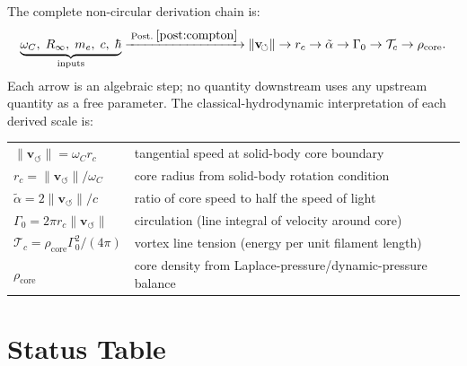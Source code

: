 \documentclass[aps,pra,preprint,longbibliography,nofootinbib]{revtex4-2}
\newcommand{\vnorm}{\lVert\mathbf{v}_{\!\boldsymbol{\circlearrowleft}}\rVert} %
\newcommand{\rhocore}{\rho_{\mathrm{core}}}      %
\newcommand{\rc}{r_c}                            %
\newcommand{\omC}{\omega_C}                      %
\newcommand{\Rinf}{R_\infty}                     %
\newcommand{\Tc}{\mathcal{T}_c}                  %
\newcommand{\Gz}{\Gamma_0}                       %
\begin{document}
The complete non-circular derivation chain is:
\begin{equation}
  \underbrace{\omC,\;\Rinf,\;m_e,\;c,\;\hbar}_{\text{inputs}}
  \xrightarrow{\;\text{Post.}\;\ref{post:compton}\;}
  \vnorm
  \rightarrow
  \rc
  \rightarrow
  \tilde\alpha
  \rightarrow
  \Gz
  \rightarrow
  \Tc
  \rightarrow
  \rhocore.
  \label{eq:chain}
\end{equation}
Each arrow is an algebraic step; no quantity downstream uses
any upstream quantity as a free parameter.
The classical-hydrodynamic interpretation of each derived scale is:

\medskip
\begin{tabular}{ll}
$\vnorm = \omC\rc$
  & tangential speed at solid-body core boundary \\
$\rc = \vnorm/\omC$
  & core radius from solid-body rotation condition \\
$\tilde\alpha = 2\vnorm/c$
  & ratio of core speed to half the speed of light \\
$\Gz = 2\pi\rc\vnorm$
  & circulation (line integral of velocity around core) \\
$\Tc = \rhocore\Gz^2/(4\pi)$
  & vortex line tension (energy per unit filament length) \\
$\rhocore$
  & core density from Laplace-pressure/dynamic-pressure balance \\
\end{tabular}

\section{Status Table}
\label{sec:status}
\end{document}
